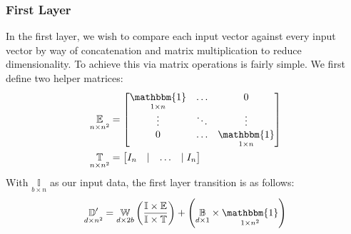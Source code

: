\subsubsection{First Layer}
\label{subsubsec:matfirstlayer}
In the first layer, we wish to compare each input vector against every input 
vector by way of concatenation and matrix multiplication to reduce 
dimensionality. To achieve this via matrix operations is fairly simple. We first 
define two helper matrices:
\begin{align*}
	\underset{n \times n^2}{\mathbb{E}} &= \begin{bmatrix}
			\underset{1 \times n}{\mathbbm{1}} & \dots & 0\\
			\vdots & \ddots & \vdots \\
		0 & \dots & \underset{1 \times n}{\mathbbm{1}} \end{bmatrix}\\
		\underset{n \times n^2}{\mathbb{T}} &= \begin{bmatrix}
	I_n & \mid & \dots & \mid I_n \end{bmatrix}
\end{align*}
With $\underset{b \times n}{\mathbb{I}}$ as our input data, the first layer 
transition is as follows:
\begin{equation}
	\label{eq:matfirst}
	\underset{d \times n^2}{\mathbb{D}^\prime} = \underset{d \times 
	2b}{\mathbb{W}}
	\left(\frac{\mathbb{I}\times\mathbb{E}}{\mathbb{I}\times\mathbb{T}}\right) + 
	\left(\underset{d \times 1}{\mathbb{B}}\times\underset{1 \times 
	n^2}{\mathbbm{1}}\right)
\end{equation}
